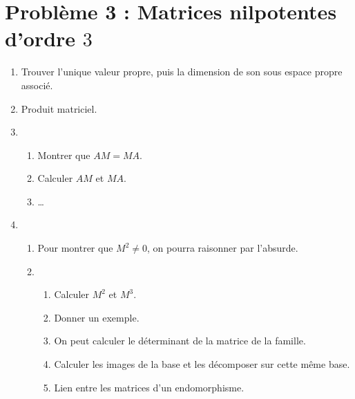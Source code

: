 \documentclass[twoside,french,11pt]{VcCours}
\begin{document}
\section*{Problème 3 : Matrices nilpotentes d'ordre $3$}
  \begin{enumerate}
  \item Trouver l'unique valeur propre, puis la dimension de son sous espace propre associé.
  \item Produit matriciel.
  \item \begin{enumerate}
  \item Montrer que $AM=MA$.
  \item Calculer $AM$ et $MA$.
  \item \ldots
  \end{enumerate}
  \item \begin{enumerate}
  \item Pour montrer que $M^2\neq0$, on pourra raisonner par l'absurde.
  \item \begin{enumerate}
  \item Calculer $M^2$ et $M^3$.
  \item Donner un exemple.
  \item On peut calculer le déterminant de la matrice de la famille.
  \item Calculer les images de la base et les décomposer sur cette même base.
  \item Lien entre les matrices d'un endomorphisme.
  \end{enumerate}
  \end{enumerate}
  \end{enumerate}
  

  
\end{document}
